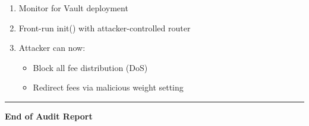\documentclass[
]{article}
\providecommand{\tightlist}{%
  \setlength{\itemsep}{0pt}\setlength{\parskip}{0pt}}
\begin{document}
\begin{enumerate}
\def\labelenumi{\arabic{enumi}.}
\tightlist
\item
  Monitor for Vault deployment
\item
  Front-run init() with attacker-controlled router
\item
  Attacker can now:

  \begin{itemize}
  \tightlist
  \item
    Block all fee distribution (DoS)
  \item
    Redirect fees via malicious weight setting
  \end{itemize}
\end{enumerate}

\begin{center}\rule{0.5\linewidth}{0.5pt}\end{center}

\textbf{End of Audit Report}
\end{document}
